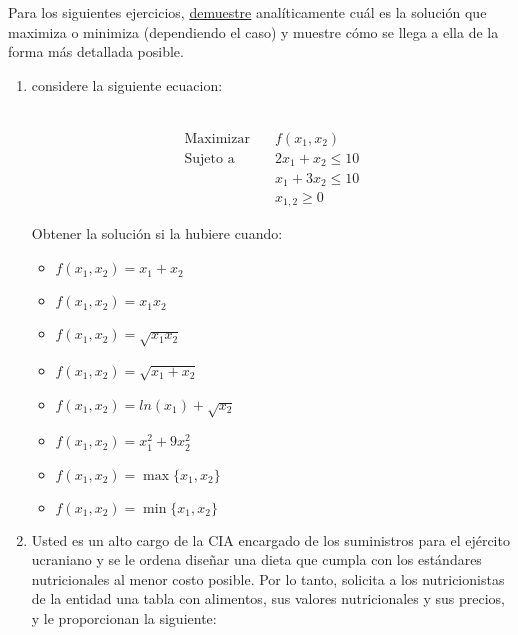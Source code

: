 \documentclass[11pt]{article}
\begin{document}
\begin{flushleft}
    Para los siguientes ejercicios, \underline{demuestre} analíticamente cuál es la solución que maximiza o minimiza (dependiendo el caso) y muestre cómo se llega a ella de la forma más detallada posible.


\begin{enumerate}[label=\Alph*)]
    \item considere la siguiente ecuacion:\\~\\
    \begin{minipage}{0.3\textwidth}
        \begin{align*}
            \text{Maximizar} \quad & f(x_1, x_2) \\
            \text{Sujeto a} \quad & 2x_1 + x_2 \leq 10 \\
            & x_1 + 3x_2 \leq 10 \\
            & x_{1,2} \geq 0
        \end{align*}
    \end{minipage}%
    \begin{minipage}{0.7\textwidth}
        Obtener la solución si la hubiere cuando:
        \begin{multicols}{2}
            \begin{itemize}
                \item $f(x_1, x_2) = x_1 + x_2$
                \item $f(x_1, x_2) = x_1x_2$
                \item $f(x_1, x_2) = \sqrt{x_1x_2}$
                \item $f(x_1, x_2) = \sqrt{x_1+x_2}$
            \end{itemize}
        \columnbreak
            \begin{itemize}
                \item $f(x_1, x_2) = ln(x_1)+\sqrt{x_2}$
                \item $f(x_1, x_2) = x_1^2 + 9x_2^2$
                \item $f(x_1, x_2) = \max\{x_1, x_2\}$
                \item $f(x_1, x_2) = \min\{x_1, x_2\}$
            \end{itemize}
        \end{multicols}
    \end{minipage}
    \item Usted es un alto cargo de la CIA encargado de los suministros para el ejército ucraniano y se le ordena diseñar una dieta que cumpla con los estándares nutricionales al menor costo posible. Por lo tanto, solicita a los nutricionistas de la entidad una tabla con alimentos, sus valores nutricionales y sus precios, y le proporcionan la siguiente:


\end{enumerate}
\end{flushleft}
\end{document}
